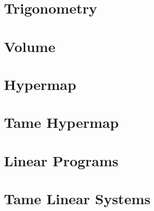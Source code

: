 \documentclass[cup9a]{cupbook}
\begin{document}
    


    
    \chapter{Trigonometry}\label{part:trig}
      
    \chapter{Volume}
    
    \chapter{Hypermap}\label{chap:hypermap}
    



    
    
    
    
    \chapter{Tame Hypermap}
    

    
    \label{part:lp}
    \label{part:lprelax}
    \chapter{Linear Programs}
    \label{sec:lp}
    
    \chapter{Tame Linear Systems}
    
\end{document}
